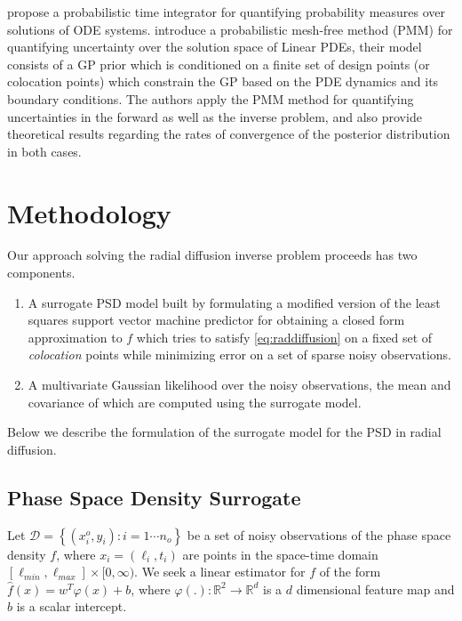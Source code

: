 \citet{conrad2017statistical} propose a probabilistic time integrator for quantifying probability 
measures over solutions of ODE systems. \citet{girolamiSullivanPDE} introduce a probabilistic 
mesh-free method (PMM) for quantifying uncertainty over the solution space of Linear PDEs, their 
model consists of a GP prior which is conditioned on a finite set of design points 
(or colocation points) which constrain the GP based on the PDE dynamics and its boundary 
conditions. The authors apply the PMM method for quantifying uncertainties in the forward as well 
as the inverse problem, and also provide theoretical results regarding the rates of convergence 
of the posterior distribution in both cases.

\section{Methodology}

Our approach solving the radial diffusion inverse problem proceeds has two components.
%
\begin{enumerate}
  \item A surrogate PSD model built by formulating a modified version of the 
        least squares support vector machine predictor for obtaining a closed form 
        approximation to $f$ which tries to satisfy \cref{eq:raddiffusion} on a fixed set of 
        \emph{colocation} points while minimizing error on a set of sparse noisy observations.
  \item A multivariate Gaussian likelihood over the noisy observations, the mean and covariance of 
        which are computed using the surrogate model.
\end{enumerate}
%
Below we describe the formulation of the surrogate model for the PSD in radial diffusion.

\subsection{Phase Space Density Surrogate}

Let $\mathcal{D}= \left\{(x^{o}_{i}, y_{i}): i = 1 \cdots n_{o} \right\}$ be a set of noisy 
observations of the phase space density $f$, where $x_{i} = (\ell_{i}, t_{i})$ are points in the 
space-time domain $[\ell_{min}, \ell_{max}] \times [0, \infty)$. We seek a linear estimator for $f$ 
of the form $\hat{f}(x) = w^{T}\varphi(x) + b$, where 
$\varphi(.): \mathbb{R}^{2} \rightarrow \mathbb{R}^{d}$ is a $d$ dimensional feature map and $b$ 
is a scalar intercept.

